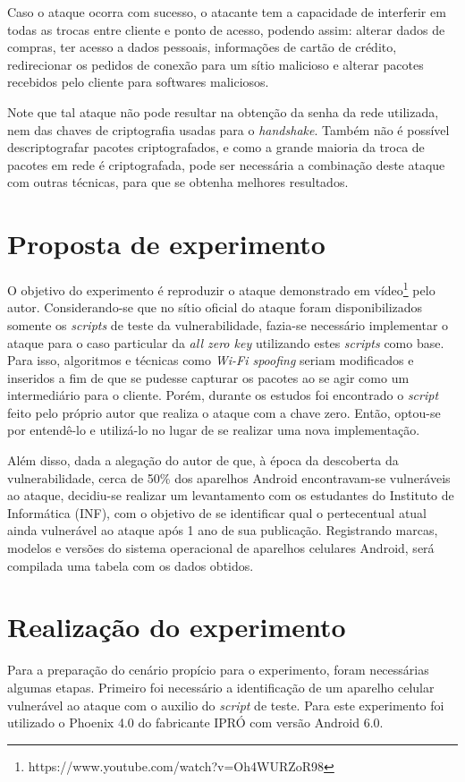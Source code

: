 \documentclass[12pt]{article}
\begin{document}
Caso o ataque ocorra com sucesso, o atacante tem a capacidade de interferir em todas as trocas entre cliente e ponto de acesso, podendo assim: alterar dados de compras, ter acesso a dados pessoais, informações de cartão de crédito, redirecionar os pedidos de conexão para um sítio malicioso e alterar pacotes recebidos pelo cliente para softwares maliciosos. 

Note que tal ataque não pode resultar na obtenção da senha da rede utilizada, nem das chaves de criptografia usadas para o \textit{handshake}. Também não é possível descriptografar pacotes criptografados, e como a grande maioria da troca de pacotes em rede é criptografada, pode ser necessária a combinação deste ataque com outras técnicas, para que se obtenha melhores resultados.


\section{Proposta de experimento}
O objetivo do experimento é reproduzir o ataque demonstrado em vídeo\footnote{https://www.youtube.com/watch?v=Oh4WURZoR98} pelo autor. Considerando-se que no sítio oficial do ataque foram disponibilizados somente os \textit{scripts} de teste da vulnerabilidade, fazia-se necessário implementar o ataque para o caso particular da \textit{all zero key} utilizando estes \textit{scripts} como base. Para isso, algoritmos e técnicas como \textit{Wi-Fi spoofing} seriam modificados e inseridos a fim de que se pudesse capturar os pacotes ao se agir como um intermediário para o cliente. Porém, durante os estudos foi encontrado o \textit{script} feito pelo próprio autor que realiza o ataque com a chave zero. Então, optou-se por entendê-lo e utilizá-lo no lugar de se realizar uma nova implementação.  

Além disso, dada a alegação do autor de que, à época da descoberta da vulnerabilidade, cerca de 50\% dos aparelhos Android encontravam-se vulneráveis ao ataque, decidiu-se realizar um levantamento com os estudantes do Instituto de Informática (INF), com o objetivo de se identificar qual o pertecentual atual ainda vulnerável ao ataque após 1 ano de sua publicação. Registrando marcas, modelos e versões do sistema operacional de aparelhos celulares Android, será compilada uma tabela com os dados obtidos.

\section{Realização do experimento}
Para a preparação do cenário propício para o experimento, foram necessárias algumas etapas. Primeiro foi necessário a identificação de um aparelho celular vulnerável ao ataque com o auxilio do \textit{script} de teste. Para este experimento foi utilizado o Phoenix 4.0 do fabricante IPRÓ com versão Android 6.0.
\end{document}

